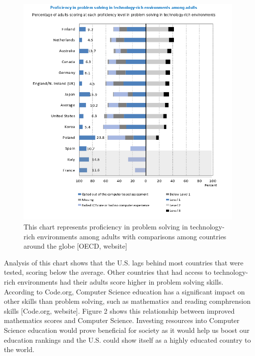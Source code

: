 \documentclass[12pt, letterpaper]{report}
\begin{document}
\begin{figure}[H]
    \centering
    \includegraphics[scale=0.75]{figure1.png}
    \captionsetup{justification=centering}
    \caption{This chart represents proficiency in problem solving in technology-rich environments among adults with comparisons among countries around the globe [OECD, website]}
\end{figure}

Analysis of this chart shows that the U.S. lags behind most countries that were tested, scoring below the average. Other countries that had access to technology-rich environments had their adults score higher in problem solving skills. According to Code.org, Computer Science education has a significant impact on other skills than problem solving, such as mathematics and reading comphrension skills [Code.org, website]. Figure 2 shows this relationship between improved mathematics scores and Computer Science. Investing resources into Computer Science education would prove beneficial for society as it would help us boost our education rankings and the U.S. could show itself as a highly educated country to the world. \\
\end{document}
